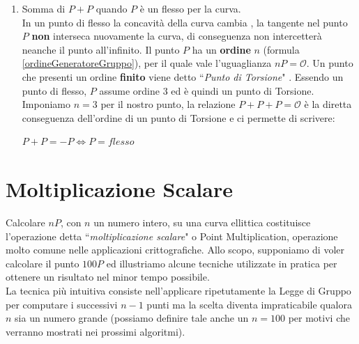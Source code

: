 \documentclass[a4paper,12pt]{tesiinfo}
\renewcommand{\footnotesize}{\fontsize{9pt}{11pt}\selectfont}
\begin{document}
\begin{enumerate}
\begin{gather}
\begin{cases}
y_C = m(x_A - x_C)-y_A
\label{point doubling 1234}
\end{cases}
\end{gather}
Le coordinate di $C$ sono calcolate mediante formule analoghe alla Point Addition: si considera l'intersezione della tangente con la curva $E$, si eguaglia il risultato al prodotto delle radici $x_A$ e $x_C$ ricordando che la prima ha molteplicit\`a 2. Infine si considerano i monomi dello stesso grado, esattamente come fatto per la Legge di Gruppo, trovando le formule qui sopra descritte
%
%
%
%
%
%
%
 \item Somma di $P+P$ quando $P$ \`e un flesso per la curva. 
 \\
 In un punto di flesso la concavit\`a della curva cambia
 , la tangente nel punto $P$ \textbf{non} interseca nuovamente la curva, di conseguenza non intercetter\`a neanche il punto all'infinito. Il punto $P$ ha un \textbf{ordine} $n$ (formula \ref{ordineGeneratoreGruppo}), per il quale vale l'uguaglianza $nP = \mathcal{O}$. Un punto che presenti un ordine \textbf{finito} viene detto ``\textit{Punto di Torsione}" \cite{P_Torsione p9}. Essendo un punto di flesso, $P$ assume ordine 3 ed \`e quindi un punto di Torsione.
 \\
 Imponiamo $n=3$ per il nostro punto, la relazione $P+P+P = \mathcal{O}$ \`e la diretta conseguenza dell'ordine di un punto di Torsione e ci permette di scrivere: 
 \begin{center}
  $P+P=-P \iff P = flesso$
 \end{center}
\end{enumerate}
%
%
%
%
%
\section{Moltiplicazione Scalare}
Calcolare $nP$, con $n$ un numero intero, su una curva ellittica costituisce l'operazione detta ``\textit{moltiplicazione scalare}" o Point Multiplication, operazione molto comune nelle applicazioni crittografiche. Allo scopo, supponiamo di voler calcolare il punto $100P$ ed illustriamo alcune tecniche utilizzate in pratica per ottenere un risultato nel minor tempo possibile.
\\
La tecnica pi\`u intuitiva consiste nell'applicare ripetutamente la Legge di Gruppo per computare i successivi $n-1$ punti ma la scelta diventa impraticabile qualora $n$ sia un numero grande (possiamo definire tale anche un $n=100$ per motivi che verranno mostrati nei prossimi algoritmi).
\end{document}
